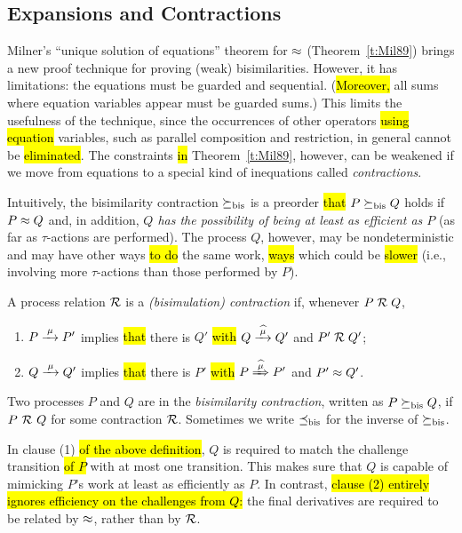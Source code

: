 \subsection{Expansions and Contractions}
\label{s:mcontr}

Milner's ``unique solution of equations'' theorem for $\approx$
(Theorem~\ref{t:Mil89})
brings a new proof technique for proving (weak) bisimilarities. However, it has
 limitations: the equations must be guarded and sequential. (\hl{Moreover,}
all sums where equation variables appear must be guarded sums.)
This limits the usefulness of the technique, since
the occurrences of other operators \hl{using equation} variables, such as parallel
composition and restriction,
in general cannot be \hl{eliminated}. %
The constraints \hl{in} Theorem~\ref{t:Mil89}, however, can be
weakened if we move from equations to a special kind of inequations called
  \emph{contractions}.

Intuitively, the bisimilarity contraction $\mathrel{\succeq_{\rm{bis}}}$ is a preorder
\hl{that} $P \mathrel{\succeq_{\rm{bis}}} Q$ holds if $P \approx Q$ and, in addition, 
\emph{$Q$ has the possibility of being at least as efficient as $P$} (as far as
$\tau$-actions are performed).
The process $Q$, however, may be nondeterministic and may have other ways
\hl{to do} the same work, \hl{ways} which could be \hl{slower} (i.e., involving
more $\tau$-actions than those performed by $P$).

\begin{definition}[contraction]
\label{d:BisCon}
A process relation ${{\cal R}}$ 
 is a \emph{(bisimulation) contraction} if, whenever $P\mathrel{\cal R} Q$,

\begin{enumerate}
\item $P \arr\mu P'$ implies \hl{that} there is $Q'$ \hl{with} $Q \arcap \mu
  Q'$ and $P' \mathrel{\cal R} Q'$;
\item $Q \arr\mu Q'$ implies \hl{that} there is $P'$ \hl{with} $P \Arcap \mu
 P'$ and $P' \approx Q'$.
\end{enumerate}
Two processes $P$ and $Q$ are in the \emph{bisimilarity
contraction}, written as $P \mathrel{\succeq_{\rm{bis}}} Q$,
if $P\ {\cal R}\ Q$ for some contraction ${\cal R}$.
Sometimes we write $\mathrel{\preceq_{\rm{bis}}}$ for the inverse of $\mathrel{\succeq_{\rm{bis}}}$.
\end{definition}
In clause (1) \hl{of the above definition}, $Q$ is required to match the challenge
transition \hl{of $P$} with at most one transition.
This makes sure that $Q$ is capable of mimicking %
$P$'s work at least as efficiently as $P$. 
In contrast, \hl{clause (2) entirely ignores efficiency on the challenges from $Q$:}
the final derivatives are required to be related by $\approx$, rather than by ${\cal R}$.


